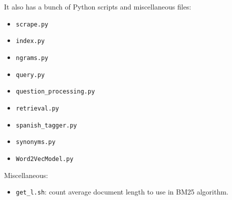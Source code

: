 \documentclass[letterpaper, margin=1in]{article}
\begin{document}
It also has a bunch of Python scripts and miscellaneous files:

\begin{itemize}
\item \texttt{scrape.py}
\item \texttt{index.py}
\item \texttt{ngrams.py}
\item \texttt{query.py}
\item \texttt{question{\_}processing.py}
\item \texttt{retrieval.py}
\item \texttt{spanish{\_}tagger.py}
\item \texttt{synonyms.py}
\item \texttt{Word2VecModel.py}
\end{itemize}

Miscellaneous:
\begin{itemize}
\item \texttt{get{\_}l.sh}: count average document length to use in BM25 algorithm.
\end{itemize}
\end{document}
